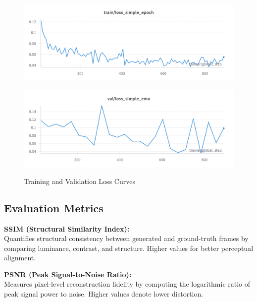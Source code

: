 \begin{figure}[htbp]
    \centering
    \begin{minipage}{0.45\textwidth}
        \centering
        \includegraphics[width=\textwidth]{figs/train_loss.png}  
        \label{fig:train_loss}
    \end{minipage}\hfill
    \begin{minipage}{0.45\textwidth}
        \centering
        \includegraphics[width=\textwidth]{figs/val_loss.png}  
        \label{fig:validation_loss}
    \end{minipage}
    \caption{Training and Validation Loss Curves}
    \label{fig:loss_curves}
\end{figure}


\subsection{Evaluation Metrics}
\label{sec:exp-metrics}

\textbf{SSIM (Structural Similarity Index):} \\
\noindent
Quantifies structural consistency between generated and ground-truth frames by comparing luminance, contrast, and structure. 
Higher values for better perceptual alignment.

\noindent
\textbf{PSNR (Peak Signal-to-Noise Ratio):}\\
\noindent
Measures pixel-level reconstruction fidelity by computing the logarithmic ratio of peak signal power to noise. 
Higher values denote lower distortion.

